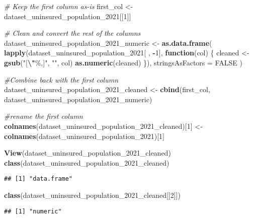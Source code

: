 \documentclass[
]{article}
\newenvironment{Shaded}{\begin{snugshade}}{\end{snugshade}}
\newcommand{\AttributeTok}[1]{\textcolor[rgb]{0.13,0.29,0.53}{#1}}
\newcommand{\CommentTok}[1]{\textcolor[rgb]{0.56,0.35,0.01}{\textit{#1}}}
\newcommand{\ConstantTok}[1]{\textcolor[rgb]{0.56,0.35,0.01}{#1}}
\newcommand{\ControlFlowTok}[1]{\textcolor[rgb]{0.13,0.29,0.53}{\textbf{#1}}}
\newcommand{\DecValTok}[1]{\textcolor[rgb]{0.00,0.00,0.81}{#1}}
\newcommand{\FunctionTok}[1]{\textcolor[rgb]{0.13,0.29,0.53}{\textbf{#1}}}
\newcommand{\NormalTok}[1]{#1}
\newcommand{\OtherTok}[1]{\textcolor[rgb]{0.56,0.35,0.01}{#1}}
\newcommand{\SpecialCharTok}[1]{\textcolor[rgb]{0.81,0.36,0.00}{\textbf{#1}}}
\newcommand{\StringTok}[1]{\textcolor[rgb]{0.31,0.60,0.02}{#1}}
\begin{document}
\begin{Shaded}
\begin{Highlighting}[]
\CommentTok{\# Keep the first column as{-}is}
\NormalTok{first\_col }\OtherTok{\textless{}{-}}\NormalTok{ dataset\_uninsured\_population\_2021[[}\DecValTok{1}\NormalTok{]]}

\CommentTok{\# Clean and convert the rest of the columns}
\NormalTok{dataset\_uninsured\_population\_2021\_numeric }\OtherTok{\textless{}{-}} \FunctionTok{as.data.frame}\NormalTok{(}
  \FunctionTok{lapply}\NormalTok{(dataset\_uninsured\_population\_2021[ , }\SpecialCharTok{{-}}\DecValTok{1}\NormalTok{], }\ControlFlowTok{function}\NormalTok{(col) \{}
\NormalTok{    cleaned }\OtherTok{\textless{}{-}} \FunctionTok{gsub}\NormalTok{(}\StringTok{"[}\SpecialCharTok{\textbackslash{}"}\StringTok{\%,]"}\NormalTok{, }\StringTok{""}\NormalTok{, col)}
    \FunctionTok{as.numeric}\NormalTok{(cleaned)}
\NormalTok{  \}),}
  \AttributeTok{stringsAsFactors =} \ConstantTok{FALSE}
\NormalTok{)}

\CommentTok{\#Combine back with the first column}
\NormalTok{dataset\_uninsured\_population\_2021\_cleaned }\OtherTok{\textless{}{-}} \FunctionTok{cbind}\NormalTok{(first\_col, dataset\_uninsured\_population\_2021\_numeric)}

\CommentTok{\#rename the first column}
\FunctionTok{colnames}\NormalTok{(dataset\_uninsured\_population\_2021\_cleaned)[}\DecValTok{1}\NormalTok{] }\OtherTok{\textless{}{-}} \FunctionTok{colnames}\NormalTok{(dataset\_uninsured\_population\_2021)[}\DecValTok{1}\NormalTok{]}

\FunctionTok{View}\NormalTok{(dataset\_uninsured\_population\_2021\_cleaned)}
\FunctionTok{class}\NormalTok{(dataset\_uninsured\_population\_2021\_cleaned)}
\end{Highlighting}
\end{Shaded}

\begin{verbatim}
## [1] "data.frame"
\end{verbatim}

\begin{Shaded}
\begin{Highlighting}[]
\FunctionTok{class}\NormalTok{(dataset\_uninsured\_population\_2021\_cleaned[[}\DecValTok{2}\NormalTok{]])}
\end{Highlighting}
\end{Shaded}

\begin{verbatim}
## [1] "numeric"
\end{verbatim}
\end{document}
